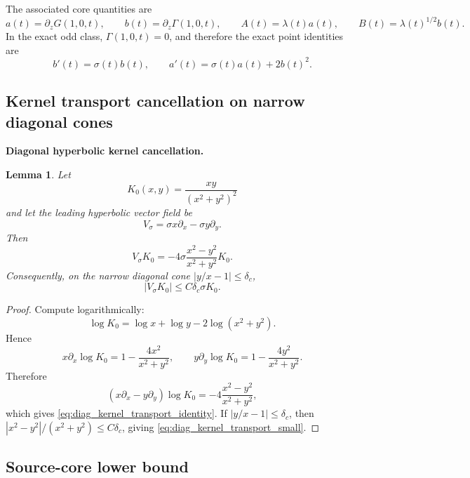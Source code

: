 \documentclass[11pt]{amsart}
\newtheorem{lemma}[theorem]{Lemma}
\begin{document}
The associated core quantities are
\begin{equation}\label{eq:diag_core_quantities}
a(t)=\partial_zG(1,0,t),
\qquad
b(t)=\partial_z\Gamma(1,0,t),
\qquad
A(t)=\lambda(t)a(t),
\qquad
B(t)=\lambda(t)^{1/2}b(t).
\end{equation}
In the exact odd class, \(\Gamma(1,0,t)=0\), and therefore the exact point identities are
\begin{equation}\label{eq:exact_odd_diag_identities}
b'(t)=\sigma(t)b(t),
\qquad
a'(t)=\sigma(t)a(t)+2b(t)^2.
\end{equation}

\subsection{Kernel transport cancellation on narrow diagonal cones}

\medskip
\noindent\textbf{Diagonal hyperbolic kernel cancellation.}
\begin{lemma}\label{lem:diag_kernel_transport}
Let
\[
K_0(x,y)=\frac{xy}{(x^2+y^2)^2}
\]
and let the leading hyperbolic vector field be
\[
V_\sigma=\sigma x\partial_x-\sigma y\partial_y.
\]
Then
\begin{equation}\label{eq:diag_kernel_transport_identity}
V_\sigma K_0
=
-4\sigma\frac{x^2-y^2}{x^2+y^2}K_0.
\end{equation}
Consequently, on the narrow diagonal cone \(|y/x-1|\le\delta_c\),
\begin{equation}\label{eq:diag_kernel_transport_small}
|V_\sigma K_0|
\le
C\delta_c\sigma K_0.
\end{equation}
\end{lemma}

\begin{proof}
Compute logarithmically:
\[
\log K_0=\log x+\log y-2\log(x^2+y^2).
\]
Hence
\[
x\partial_x\log K_0=1-\frac{4x^2}{x^2+y^2},
\qquad
 y\partial_y\log K_0=1-\frac{4y^2}{x^2+y^2}.
\]
Therefore
\[
(x\partial_x-y\partial_y)\log K_0
=-4\frac{x^2-y^2}{x^2+y^2},
\]
which gives \eqref{eq:diag_kernel_transport_identity}.  If \(|y/x-1|\le\delta_c\), then \(|x^2-y^2|/(x^2+y^2)\le C\delta_c\), giving \eqref{eq:diag_kernel_transport_small}.
\end{proof}

\subsection{Source-core lower bound}
\end{document}
